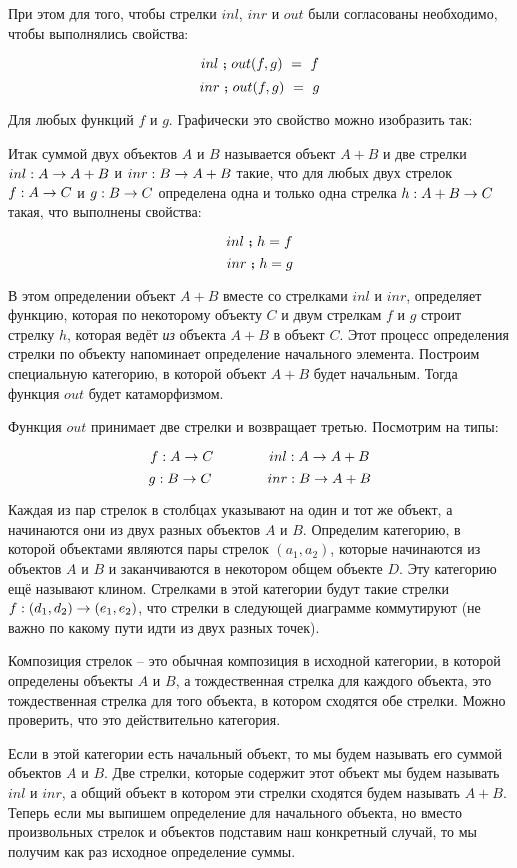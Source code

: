 При этом для того, чтобы стрелки $inl$, $inr$ и $out$
были согласованы необходимо, чтобы выполнялись свойства:

\[ inl \footnotesize\textbf{~;~}\normalsize out(f,g)\ =\ f   \]
\[ inr \footnotesize\textbf{~;~}\normalsize out(f,g)\ =\ g   \]

Для любых функций $f$ и $g$. Графически это свойство
можно изобразить так:


Итак суммой двух объектов $A$ и $B$ называется объект
$A+B$ и две стрелки $inl : A \rightarrow A+B$ и $inr : B \rightarrow A+B$ 
такие, что для любых двух стрелок $f : A \rightarrow C$ и $g : B \rightarrow C$
определена одна и только одна стрелка $h : A+B \rightarrow C$ 
такая, что выполнены свойства:

\[ inl \footnotesize\textbf{~;~}\normalsize h = f \]
\[ inr \footnotesize\textbf{~;~}\normalsize h = g \]

В этом определении объект $A+B$ вместе со стрелками $inl$
и $inr$, определяет функцию, которая по некоторому
объекту $C$ и двум стрелкам $f$ и $g$ строит стрелку $h$,
которая ведёт \emph{из} объекта $A+B$ в объект $C$.
Этот процесс определения стрелки по объекту напоминает
определение начального элемента. Построим 
специальную категорию, в которой объект $A+B$ будет
начальным. Тогда функция $out$ будет катаморфизмом.

Функция $out$ принимает две стрелки и возвращает 
третью. Посмотрим на типы:

\[ f : A \rightarrow C  \qquad\qquad inl : A \rightarrow A+B \]
\[ g : B \rightarrow C  \qquad\qquad inr : B \rightarrow A+B \]

Каждая из пар стрелок в столбцах указывают на один и тот же
объект, а начинаются они из двух разных объектов $A$ и $B$. 
Определим категорию, в которой объектами являются пары
стрелок $(a_1, a_2)$, которые начинаются из объектов $A$ и $B$ 
и заканчиваются в некотором общем объекте $D$. Эту категорию
ещё называют клином. Стрелками в этой категории будут
такие стрелки $f : (d_1, d_2) \rightarrow (e_1, e_2)$, что стрелки
в следующей диаграмме коммутируют (не важно по какому пути
идти из двух разных точек).


Композиция стрелок -- это обычная композиция в исходной категории, 
в которой определены объекты $A$ и $B$, а тождественная
стрелка для каждого объекта, это тождественная стрелка для 
того объекта, в котором сходятся обе стрелки. Можно проверить,
что это действительно категория.

Если в этой категории есть начальный объект, то мы
будем называть его суммой объектов $A$ и $B$. Две
стрелки, которые содержит этот объект мы будем называть
$inl$ и $inr$, а общий объект в котором эти стрелки сходятся
будем называть $A+B$. Теперь если мы выпишем определение
для начального объекта, но вместо произвольных стрелок и
объектов подставим наш конкретный случай, то мы получим
как раз исходное определение суммы.


